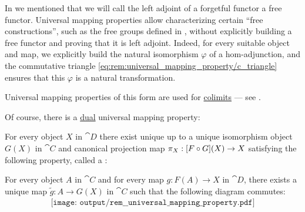 \begin{remark}
  In  we mentioned that we will call the left adjoint of a forgetful functor a free functor. Universal mapping properties allow characterizing certain \enquote{free constructions}, such as the free groups defined in , without explicitly building a free functor and proving that it is left adjoint. Indeed, for every suitable object and map, we explicitly build the natural isomorphism \( \varphi \) of a hom-adjunction, and the commutative triangle \eqref{eq:rem:universal_mapping_property/c_triangle} ensures that this \( \varphi \) is a natural transformation.

  Universal mapping properties of this form are used for \hyperref[def:category_of_cones/colimit]{colimits} --- see .

  Of course, there is a \hyperref[thm:categorical_principle_of_duality]{dual} universal mapping property:
  \begin{displayquote}
    For every object \( X \) in \( \cat{D} \) there exist unique up to a unique isomorphism object \( G(X) \) in \( \cat{C} \) and canonical projection map \( \pi_X: [F \bincirc G](X) \to X \) satisfying the following property, called a :
    \begin{displayquote}
      For every object \( A \) in \( \cat{C} \) and for every map \( g: F(A) \to X \) in \( \cat{D} \), there exists a unique map \( \widetilde{g}: A \to G(X) \) in \( \cat{C} \) such that the following diagram commutes:
      \begin{equation}\label{eq:rem:universal_mapping_property/d_triangle}
        \begin{aligned}
          \texttt{[image: output/rem\_\_universal\_mapping\_property.pdf]}
        \end{aligned}
      \end{equation}
    \end{displayquote}
  \end{displayquote}


\end{remark}
